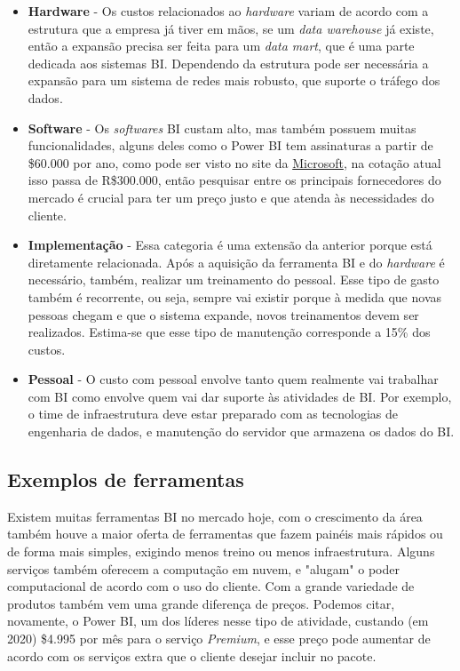 \begin{itemize}
	\item \textbf{Hardware} - Os custos relacionados ao \textit{hardware} variam de acordo com a estrutura que a empresa já tiver em mãos, se um \textit{data warehouse} já existe, então a expansão precisa ser feita para um \textit{data mart}, que é uma parte dedicada aos sistemas BI. Dependendo da estrutura pode ser necessária a expansão para um sistema de redes mais robusto, que suporte o tráfego dos dados.
	
	\item \textbf{Software} - Os \textit{softwares} BI custam alto, mas também possuem muitas funcionalidades, alguns deles como o Power BI tem assinaturas a partir de \$60.000 por ano, como pode ser visto no site da \href{https://powerbi.microsoft.com/en-us/pricing/}{Microsoft}, na cotação atual isso passa de R\$300.000, então pesquisar entre os principais fornecedores do mercado é crucial para ter um preço justo e que atenda às necessidades do cliente.
	
	\item \textbf{Implementação} - Essa categoria é uma extensão da anterior porque está diretamente relacionada. Após a aquisição da ferramenta BI e do \textit{hardware} é necessário, também, realizar um treinamento do pessoal. Esse tipo de gasto também é recorrente, ou seja, sempre vai existir porque à medida que novas pessoas chegam e que o sistema expande, novos treinamentos devem ser realizados. Estima-se que esse tipo de manutenção corresponde a 15\% dos custos.
	
	\item \textbf{Pessoal} - O custo com pessoal envolve tanto quem realmente vai trabalhar com BI como envolve quem vai dar suporte às atividades de BI. Por exemplo, o time de infraestrutura deve estar preparado com as tecnologias de engenharia de dados, e manutenção do servidor que armazena os dados do BI.
	
\end{itemize}

\subsection{Exemplos de ferramentas}

Existem muitas ferramentas BI no mercado hoje, com o crescimento da área também houve a maior oferta de ferramentas que fazem painéis mais rápidos ou de forma mais simples, exigindo menos treino ou menos infraestrutura. Alguns serviços também oferecem a computação em nuvem, e "alugam" o poder computacional de acordo com o uso do cliente. Com a grande variedade de produtos também vem uma grande diferença de preços. Podemos citar, novamente, o Power BI, um dos líderes nesse tipo de atividade, custando (em 2020) \$4.995 por mês para o serviço \textit{Premium}, e esse preço pode aumentar de acordo com os serviços extra que o cliente desejar incluir no pacote.

